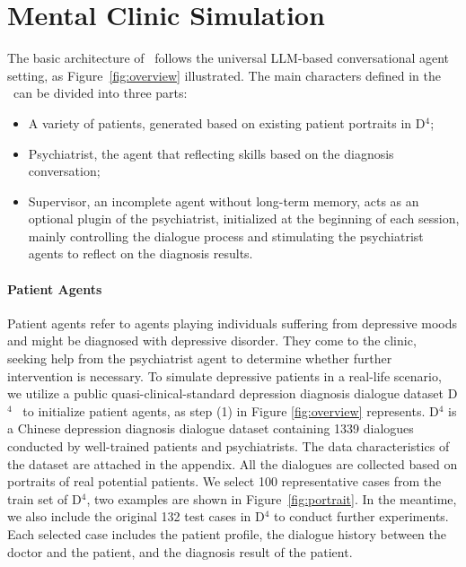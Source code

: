 
\section{Mental Clinic Simulation}

The basic architecture of \system~follows the universal LLM-based conversational agent~\cite{Park2023GenerativeAgents} setting, as Figure~\ref{fig:overview} illustrated. The main characters defined in the \system~can be divided into three parts: 
\begin{itemize}
    \item A variety of patients, generated based on existing patient portraits in D$^4$;
    \item Psychiatrist, the agent that reflecting skills based on the diagnosis conversation;
    \item Supervisor, an incomplete agent without long-term memory, acts as an optional plugin of the psychiatrist, initialized at the beginning of each session, mainly controlling the dialogue process and stimulating the psychiatrist agents to reflect on the diagnosis results.
\end{itemize}

\paragraph{Patient Agents}

Patient agents refer to agents playing individuals suffering from depressive moods and might be diagnosed with depressive disorder. They come to the clinic, seeking help from the psychiatrist agent to determine whether further intervention is necessary. To simulate depressive patients in a real-life scenario, we utilize a public quasi-clinical-standard depression diagnosis dialogue dataset D$^4$~\cite{yao-etal-2022-d4} to initialize patient agents, as step (1) in Figure \ref{fig:overview} represents. D$^4$ is a Chinese depression diagnosis dialogue dataset containing 1339 dialogues conducted by well-trained patients and psychiatrists. The data characteristics of the dataset are attached in the appendix. All the dialogues are collected based on portraits of real potential patients. We select 100 representative cases from the train set of D$^4$, two examples are shown in Figure~\ref{fig:portrait}. In the meantime, we also include the original 132 test cases in D$^4$ to conduct further experiments. Each selected case includes the patient profile, the dialogue history between the doctor and the patient, and the diagnosis result of the patient. \label{train/test}

